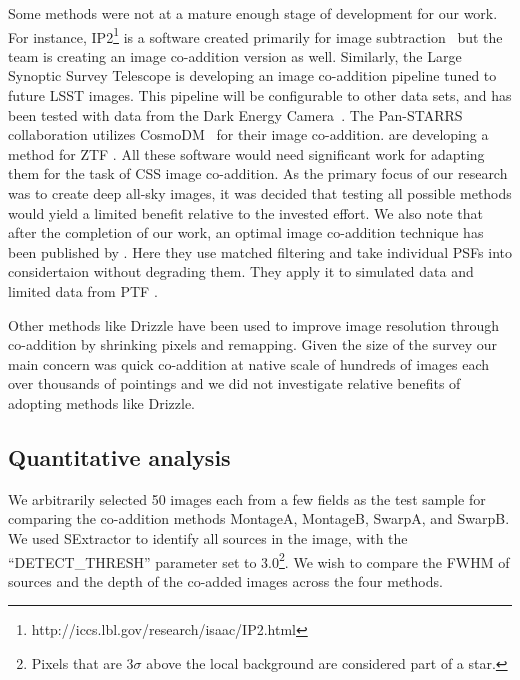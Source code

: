 \documentclass[fleqn,usenatbib]{mnras}
\begin{document}
Some methods were not at a mature enough stage of development for our work. For instance, IP2\footnote{http://iccs.lbl.gov/research/isaac/IP2.html} is a software created primarily for image subtraction~\citep{ip2,ip2ref} but the team is creating an image co-addition version as well. Similarly, the Large Synoptic Survey Telescope \citep{Ivezic2015} is developing an image co-addition pipeline tuned to future LSST images. This pipeline will be configurable to other data sets, and has been tested with data from the Dark Energy Camera~\citep{Flaughter2015}. The Pan-STARRS collaboration  \citep[and references therein]{Flewlling2016} utilizes CosmoDM~\citep{Desai2015} for their image co-addition. 
\cite{2019ApJ...881L...7G} are developing a method for ZTF \citep{bellm14}.
All these software would need significant work for adapting them for the task of CSS image co-addition. As the primary focus of our research was to create deep all-sky images,  it was decided that testing all possible methods would yield a limited benefit relative to the invested effort. We also note that after the completion of our work, an optimal image co-addition technique has been published by \citet{Zackay2017a,Zackay2017b}. Here they use matched filtering and take individual PSFs into considertaion without degrading them. They apply it to simulated data and limited data from PTF \citep{Law2009,Rau2009}.

Other methods like Drizzle \citep{Fruchter2002} have been used to improve image resolution through co-addition by shrinking pixels and remapping. Given the size of the survey our main concern was quick co-addition at native scale of hundreds of images each over thousands of pointings and we did not investigate relative benefits of adopting methods like Drizzle.

\subsection{Quantitative analysis\label{sec:q}}
We arbitrarily selected 50 images each from a few fields as the test sample for comparing the co-addition methods MontageA, MontageB, SwarpA, and SwarpB. We used SExtractor to identify all sources in the image, with the ``DETECT\_THRESH'' parameter set to 3.0\footnote{Pixels that are $3\sigma$ above the local background are considered part of a star.}. We wish to compare the FWHM of sources and the depth of the co-added images across the four methods.
\end{document}
